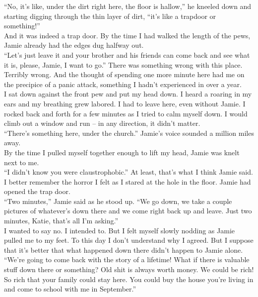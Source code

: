 \documentclass[a5paper]{scrartcl}
\begin{document}
\enquote{No, it's like, under the dirt right here, the floor is hallow,} he kneeled down and starting digging through the thin layer of dirt, \enquote{it's like a trapdoor or something!}\\


And it was indeed a trap door. By the time I had walked the length of the pews, Jamie already had the edges dug halfway out.\\


\enquote{Let's just leave it and your brother and his friends can come back and see what it is, please, Jamie, I want to go.} There was something wrong with this place. Terribly wrong. And the thought of spending one more minute here had me on the precipice of a panic attack, something I hadn't experienced in over a year. \\


I sat down against the front pew and put my head down. I heard a roaring in my ears and my breathing grew labored. I had to leave here, even without Jamie. I rocked back and forth for a few minutes as I tried to calm myself down. I would climb out a window and run – in any direction, it didn't matter.\\


\enquote{There's something here, under the church.} Jamie's voice sounded a million miles away.\\


By the time I pulled myself together enough to lift my head, Jamie was knelt next to me.\\


\enquote{I didn't know you were claustrophobic.} At least, that's what I think Jamie said. I better remember the horror I felt as I stared at the hole in the floor. Jamie had opened the trap door.\\


\enquote{Two minutes,} Jamie said as he stood up. \enquote{We go down, we take a couple pictures of whatever's down there and we come right back up and leave. Just two minutes, Katie, that's all I'm asking.}\\


I wanted to say no. I intended to. But I felt myself slowly nodding as Jamie pulled me to my feet. To this day I don't understand why I agreed. But I suppose that it's better that what happened down there didn't happen to Jamie alone.\\


\enquote{We're going to come back with the story of a lifetime! What if there is valuable stuff down there or something? Old shit is always worth money. We could be rich! So rich that your family could stay here. You could buy the house you're living in and come to school with me in September.}\\
\end{document}
